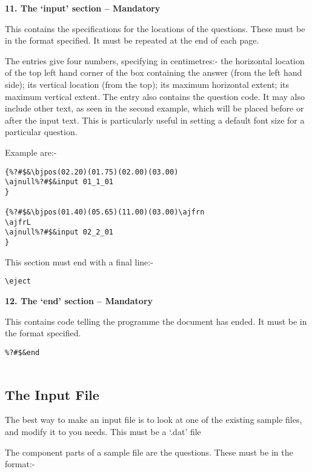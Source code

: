 \vspace*{0.2cm}
{\bf \large 11. The `input' section -- Mandatory}
\vspace*{0.2cm}

This contains the specifications for the locations of the questions. These
must be in the format specified. It must be repeated at the end of each
page. 

The entries give four numbers, specifying in centimetres:- the horizontal
location of the top left hand corner of the box containing the answer (from
the left hand side); its vertical location (from the top); its maximum
horizontal extent; its maximum vertical extent.  The entry also contains
the question code. It may also include other text, as seen in the second
example, which will be placed before or after the input text. This is
particularly useful in setting a default font size for a particular
question. 

Example are:-

\begin{verbatim}
{%?#$&\bjpos(02.20)(01.75)(02.00)(03.00)
\ajnull%?#$&input 01_1_01
}

{%?#$&\bjpos(01.40)(05.65)(11.00)(03.00)\ajfrn
\ajfrL
\ajnull%?#$&input 02_2_01
}
\end{verbatim}

This section must end with a final line:-

\begin{verbatim}
\eject
\end{verbatim}

\vspace*{0.2cm}
{\bf \large 12. The `end' section -- Mandatory}
\vspace*{0.2cm}

This contains code telling the programme the document has ended. It must be
in the format specified. 

\begin{verbatim}
%?#$&end


\end{verbatim}

\subsection{The Input File}

The best way to make an input file is to look at one of the existing sample
files, and modify it to you needs. This must be a `.dat' file 

The component parts of a sample file are the questions. These must be in
the format:- 

